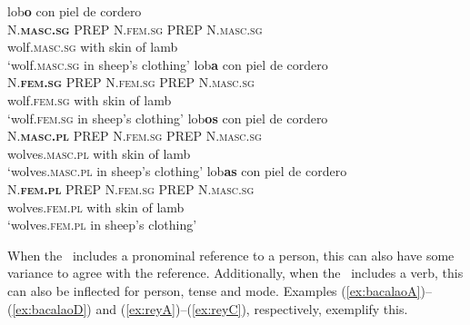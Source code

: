 \documentclass[output=paper]{langsci/langscibook}
\begin{document}
\begin{exe}
\ex
    \begin{xlist}
	\ex \label{ex:corderoA}
    \glll lob\textbf{o} con piel de cordero\\
    \textsc{N.\textbf{masc.sg}} \textsc{PREP} \textsc{N.fem.sg} \textsc{PREP} \textsc{N.masc.sg} \\
    wolf.\textsc{masc.sg} with skin of lamb \\
    \glt `wolf.\textsc{masc.sg} in sheep's clothing'
	\ex \label{ex:corderoB}
    \glll lob\textbf{a} con piel de cordero\\
    \textsc{N.\textbf{fem.sg}} \textsc{PREP} \textsc{N.fem.sg} \textsc{PREP} \textsc{N.masc.sg} \\
    wolf.\textsc{fem.sg} with skin of lamb \\
    \glt `wolf.\textsc{fem.sg} in sheep's clothing'
	\ex \label{ex:corderoC}
    \glll lob\textbf{os} con piel de cordero\\
    \textsc{N.\textbf{masc.pl}} \textsc{PREP} \textsc{N.fem.sg} \textsc{PREP} \textsc{N.masc.sg} \\
    wolves.\textsc{masc.pl} with skin of lamb \\
    \glt `wolves.\textsc{masc.pl} in sheep's clothing'
	\ex \label{ex:corderoD}
    \glll lob\textbf{as} con piel de cordero\\
   \textsc{N.\textbf{fem.pl}} \textsc{PREP} \textsc{N.fem.sg} \textsc{PREP} \textsc{N.masc.sg} \\
    wolves.\textsc{fem.pl} with skin of lamb \\
    \glt `wolves.\textsc{fem.pl} in sheep's clothing'
    \end{xlist}
\end{exe}


When the \mwe\ includes a pronominal reference to a person, this can also have some variance to agree with the reference.
Additionally, when the \mwe\ includes a verb, this can also be inflected for person, tense and mode.
Examples (\ref{ex:bacalaoA})--(\ref{ex:bacalaoD}) and (\ref{ex:reyA})--(\ref{ex:reyC}), respectively, exemplify this.
\end{document}
